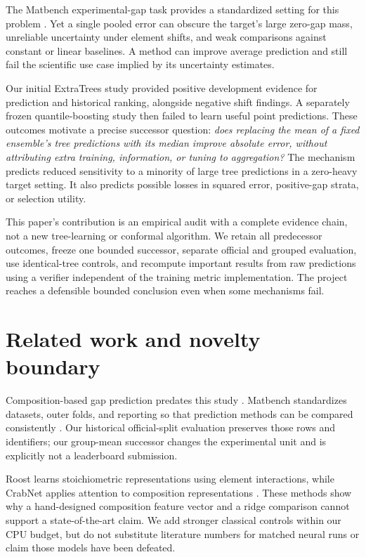 \documentclass[11pt]{article}
\begin{document}
The Matbench experimental-gap task provides a standardized setting for this problem \cite{dunn2020matbench,zhuo2018bandgaps}. Yet a single pooled error can obscure the target's large zero-gap mass, unreliable uncertainty under element shifts, and weak comparisons against constant or linear baselines. A method can improve average prediction and still fail the scientific use case implied by its uncertainty estimates.

Our initial ExtraTrees study provided positive development evidence for prediction and historical ranking, alongside negative shift findings. A separately frozen quantile-boosting study then failed to learn useful point predictions. These outcomes motivate a precise successor question: \emph{does replacing the mean of a fixed ensemble's tree predictions with its median improve absolute error, without attributing extra training, information, or tuning to aggregation?} The mechanism predicts reduced sensitivity to a minority of large tree predictions in a zero-heavy target setting. It also predicts possible losses in squared error, positive-gap strata, or selection utility.

This paper's contribution is an empirical audit with a complete evidence chain, not a new tree-learning or conformal algorithm. We retain all predecessor outcomes, freeze one bounded successor, separate official and grouped evaluation, use identical-tree controls, and recompute important results from raw predictions using a verifier independent of the training metric implementation. The project reaches a defensible bounded conclusion even when some mechanisms fail.

\section{Related work and novelty boundary}
Composition-based gap prediction predates this study \cite{zhuo2018bandgaps}. Matbench standardizes datasets, outer folds, and reporting so that prediction methods can be compared consistently \cite{dunn2020matbench}. Our historical official-split evaluation preserves those rows and identifiers; our group-mean successor changes the experimental unit and is explicitly not a leaderboard submission.

Roost learns stoichiometric representations using element interactions, while CrabNet applies attention to composition representations \cite{goodall2020roost,wang2021crabnet}. These methods show why a hand-designed composition feature vector and a ridge comparison cannot support a state-of-the-art claim. We add stronger classical controls within our CPU budget, but do not substitute literature numbers for matched neural runs or claim those models have been defeated.
\end{document}
